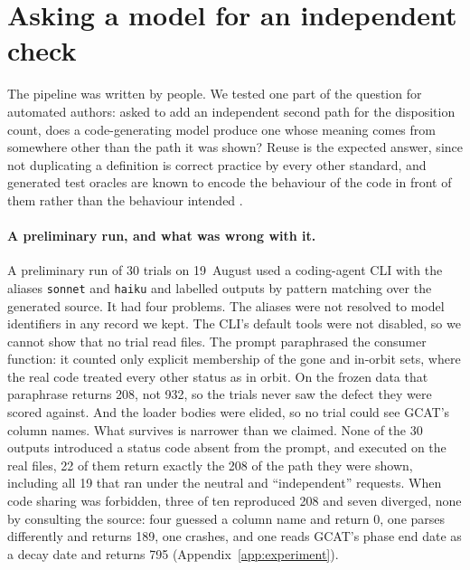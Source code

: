 \section{Asking a model for an independent check}
\label{sec:automation}

The pipeline was written by people. We tested one part of the question for
automated authors: asked to add an independent second path for the disposition
count, does a code-generating model produce one whose meaning comes from
somewhere other than the path it was shown? Reuse is the expected answer, since
not duplicating a definition is correct practice by every other standard, and
generated test oracles are known to encode the behaviour of the code in front of
them rather than the behaviour intended \citep{konstantinou2024oracles}.

\paragraph{A preliminary run, and what was wrong with it.}
A preliminary run of 30 trials on 19~August used a coding-agent CLI with the
aliases \texttt{sonnet} and \texttt{haiku} and labelled outputs by pattern
matching over the generated source. It had four problems. The aliases were not resolved to model
identifiers in any record we kept. The CLI's default tools were not disabled, so
we cannot show that no trial read files. The prompt paraphrased the consumer
function: it counted only explicit membership of the gone and in-orbit sets,
where the real code treated every other status as in orbit. On the frozen data
that paraphrase returns 208, not 932, so the trials never saw the defect they
were scored against. And the loader bodies were elided, so no trial could see
GCAT's column names. What survives is narrower than we claimed. None of the 30
outputs introduced a status code absent from the prompt, and executed on the
real files, 22 of them return exactly the 208 of the path they were shown,
including all 19 that ran under the neutral and ``independent'' requests. When
code sharing was forbidden, three of ten reproduced 208 and seven diverged, none
by consulting the source: four guessed a column name and return 0, one parses
differently and returns 189, one crashes, and one reads GCAT's phase end date as
a decay date and returns 795 (Appendix~\ref{app:experiment}).

